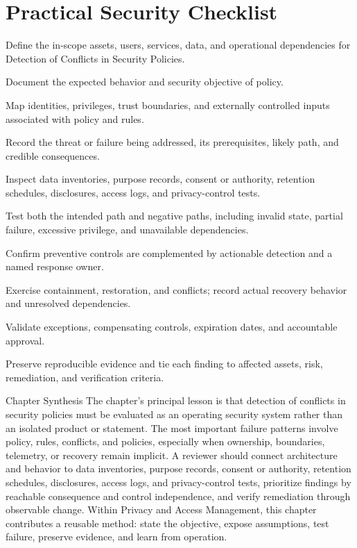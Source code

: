 \documentclass[11pt,letterpaper]{article}
\begin{document}
\section*{Practical Security Checklist}
\begin{CornellChecklist}
\item Define the in-scope assets, users, services, data, and operational dependencies for Detection of Conflicts in Security Policies.
\item Document the expected behavior and security objective of policy.
\item Map identities, privileges, trust boundaries, and externally controlled inputs associated with policy and rules.
\item Record the threat or failure being addressed, its prerequisites, likely path, and credible consequences.
\item Inspect data inventories, purpose records, consent or authority, retention schedules, disclosures, access logs, and privacy-control tests.
\item Test both the intended path and negative paths, including invalid state, partial failure, excessive privilege, and unavailable dependencies.
\item Confirm preventive controls are complemented by actionable detection and a named response owner.
\item Exercise containment, restoration, and conflicts; record actual recovery behavior and unresolved dependencies.
\item Validate exceptions, compensating controls, expiration dates, and accountable approval.
\item Preserve reproducible evidence and tie each finding to affected assets, risk, remediation, and verification criteria.
\end{CornellChecklist}
\begin{CornellSummaryBox}{Chapter Synthesis}
The chapter's principal lesson is that detection of conflicts in security policies must be evaluated as an operating security system rather than an isolated product or statement. The most important failure patterns involve policy, rules, conflicts, and policies, especially when ownership, boundaries, telemetry, or recovery remain implicit. A reviewer should connect architecture and behavior to data inventories, purpose records, consent or authority, retention schedules, disclosures, access logs, and privacy-control tests, prioritize findings by reachable consequence and control independence, and verify remediation through observable change. Within Privacy and Access Management, this chapter contributes a reusable method: state the objective, expose assumptions, test failure, preserve evidence, and learn from operation.
\end{CornellSummaryBox}
\end{document}
